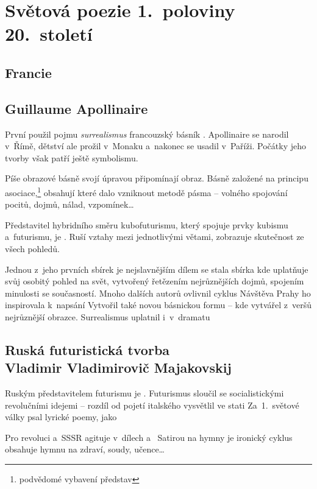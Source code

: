 \section{Světová poezie 1.~poloviny 20.~století}
\subsection*{Francie}
\subsection*{Guillaume Apollinaire}
První použil pojmu \emph{surrealismus} francouzský básník . Apollinaire se narodil v~Římě, dětství ale prožil v~Monaku
a~nakonec se usadil v~Paříži. Počátky jeho tvorby však patří ještě
symbolismu.

Píše obrazové básně  svojí úpravou připomínají obraz.
Básně založené na principu asociace,\footnote{podvědomé vybavení
představ}  obsahují  které dalo vzniknout
metodě pásma -- volného spojování pocitů, dojmů, nálad, vzpomínek\dots{}

Představitel hybridního směru kubofuturismu, který spojuje prvky kubismu
a~futurismu, je . Ruší vztahy mezi jednotlivými
větami, zobrazuje skutečnost ze všech pohledů.

Jednou z~jeho prvních sbírek je 
nejslavnějším dílem se stala sbírka  kde uplatňuje svůj
osobitý pohled na svět, vytvořený řetězením nejrůznějších dojmů,
spojením minulosti se současností. Mnoho dalších autorů ovlivnil cyklus
 Návštěva Prahy ho inspirovala k~napsání  Vytvořil také novou básnickou formu --  kde
vytvářel z~veršů nejrůznější obrazce. Surrealismus uplatnil i~v~dramatu

\subsection*{Ruská futuristická tvorba\\Vladimir Vladimirovič Majakovskij}
Ruským představitelem futurismu je .
Futurismus sloučil se socialistickými revolučními idejemi -- rozdíl od
pojetí italského vysvětlil ve stati 
Za~1.~světové války psal lyrické poemy, jako 

Pro revoluci a~SSSR agituje v~dílech  a~ Satirou na hymny je ironický cyklus  obsahuje hymnu
na zdraví, soudy, učence\dots{}

